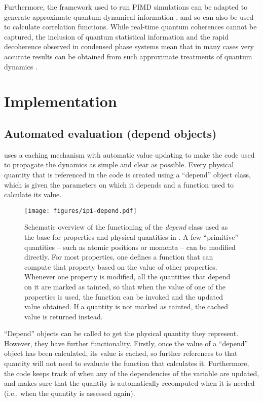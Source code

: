\documentclass[11pt,english,fleqn]{report}
\begin{document}
Furthermore, the framework used to run PIMD simulations can be adapted
to generate approximate quantum dynamical information 
\cite{cao-voth93jcp,cao-voth94jcp,crai-mano04jcp,braa-mano06jcp},
and so can also be used to calculate correlation functions. While
real-time quantum coherences cannot be captured, the inclusion 
of quantum statistical information
and the rapid decoherence observed in condensed phase systems mean
that in many cases very accurate results can be obtained from such
approximate treatments of quantum dynamics \cite{habe+13arpc}.


\section{Implementation}


\subsection{Automated evaluation (depend objects)}

\ipi uses a caching mechanism with automatic value updating to make
the code used to propagate the dynamics as simple and clear as possible.
Every physical quantity that is referenced in the code is created
using a {}``depend'' object class, which is given the parameters
on which it depends and a function used to calculate its value. 

\begin{figure}[hpbt]
\centering\texttt{[image: figures/ipi-depend.pdf]}
\caption{\label{fig:depend} Schematic overview of the functioning of the 
\emph{depend} class used as the base for properties and physical quantities in \ipi{}. 
A few ``primitive'' quantities -- such as atomic positions or momenta -- can be modified
directly. For most properties, one defines a function that can compute that property based on the
value of other properties. Whenever one property is modified, all the quantities that
depend on it are marked as tainted, so that when the value of one of the properties
is used, the function can be invoked and the updated value obtained. If a quantity
is not marked as tainted, the cached value is returned instead. 
}
\end{figure}


{}``Depend'' objects can be called to get the physical quantity
they represent. However, they have further functionality. Firstly,
once the value of a {}``depend'' object has been calculated, its
value is cached, so further references to that quantity will not need
to evaluate the function that calculates it. Furthermore, the code
keeps track of when any of the dependencies of the variable are updated,
and makes sure that the quantity is automatically recomputed when
it is needed (i.e., when the quantity is assessed again). 
\end{document}
